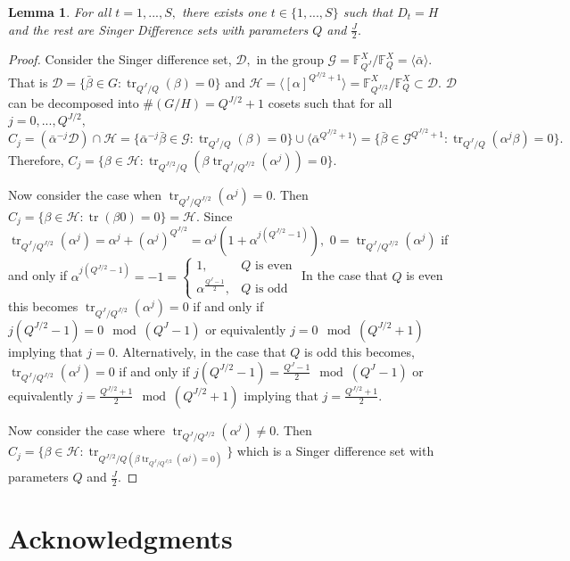 \documentclass[3p,11pt]{elsarticle}
\newcommand{\bbF}{\mathbb{F}}
\newcommand{\calD}{\mathcal{D}}
\newcommand{\calG}{\mathcal{G}}
\newcommand{\calH}{\mathcal{H}}
\newcommand{\tr}{\operatorname{tr}}
\newtheorem{lemma}[theorem]{Lemma}
\theoremstyle{definition}
\begin{document}
\begin{lemma}
For all $t=1,...,S,$ there exists one $t\in\{1,...,S\}$ such that $D_t=H$ and the rest are Singer Difference sets with parameters $Q$ and $\frac{J}{2}.$
\end{lemma}
\begin{proof}
Consider the Singer difference set, $\calD,$ in the group $\calG=\bbF_{Q^J}^X/\bbF_Q^X=\langle\bar{\alpha}\rangle.$ That is $\calD=\{\bar{\beta}\in G:\tr_{Q^J/Q}(\beta)=0\}$ and $\calH=\langle[\alpha]^{Q^{J/2}+1}\rangle=\bbF_{Q^{J/2}}^X/\bbF_Q^X\subset\calD.$ $\calD$ can be decomposed into $\#(G/H)=Q^{J/2}+1$ cosets such that for all $j=0,...,Q^{J/2},$ \begin{equation*}
C_j=\left(\bar{\alpha}^{-j}\calD\right)\cap\calH=\{\bar{\alpha}^{-j}\bar{\beta}\in\calG:\tr_{Q^J/Q}(\beta)=0\}\cup\langle\bar{\alpha}^{Q^{J/2}+1}\rangle=\{\bar{\beta}\in\calG^{Q^{J/2}+1}:\tr_{Q^J/Q}(\alpha^j\beta)=0\}.
\end{equation*}
Therefore, $C_j=\{\beta\in\calH:\tr_{Q^{J/2}/Q}\left(\beta\tr_{Q^J/Q^{J/2}}(\alpha^j)\right)=0\}.$ 

Now consider the case when $\tr_{Q^J/Q^{J/2}}(\alpha^j)=0.$ Then $C_j=\{\beta\in\calH:\tr(\beta0)=0\}=\calH.$ Since $\tr_{Q^J/Q^{J/2}}(\alpha^j)=\alpha^j+\left(\alpha^j\right)^{Q^{J/2}}=\alpha^j\left(1+\alpha^{j(Q^{J/2}-1)}\right),$ $0=\tr_{Q^J/Q^{J/2}}(\alpha^j)$ if and only if $\alpha^{j(Q^{J/2}-1)}=-1=\left\{\begin{array}{cl} 1, &Q\text{ is even}\\ \alpha^\frac{Q^J-1}{2}, &Q\text{ is odd}\end{array}\right.$ In the case that $Q$ is even this becomes $\tr_{Q^J/Q^{J/2}}(\alpha^j)=0$ if and only if $j(Q^{J/2}-1)=0\mod(Q^J-1)$ or equivalently $j=0\mod(Q^{J/2}+1)$ implying that $j=0$. Alternatively, in the case that $Q$ is odd this becomes, $\tr_{Q^J/Q^{J/2}}(\alpha^j)=0$ if and only if $j(Q^{J/2}-1)=\frac{Q^J-1}{2}\mod(Q^J-1)$ or equivalently $j=\frac{Q^{J/2}+1}{2}\mod(Q^{J/2}+1)$ implying that $j=\frac{Q^{J/2}+1}{2}.$

Now consider the case where $\tr_{Q^J/Q^{J/2}}(\alpha^j)\not=0.$ Then $C_j=\{\beta\in\calH:\tr_{Q^{J/2}/Q\left(\beta\tr_{Q^J/Q^{J/2}}(\alpha^j)=0\right)}\}$ which is a Singer difference set with parameters $Q$ and $\frac{J}{2}.$
\end{proof}



\section*{Acknowledgments}
\end{document}
